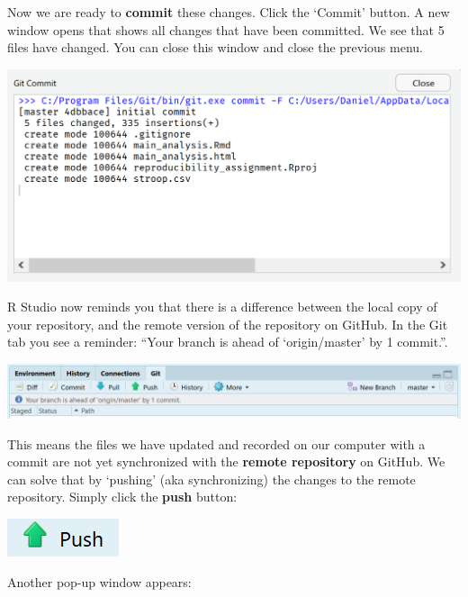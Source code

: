 \documentclass[
  oneside]{krantz}
\begin{document}
Now we are ready to \textbf{commit} these changes. Click the `Commit' button. A new
window opens that shows all changes that have been committed. We see that 5
files have changed. You can close this window and close the previous menu.

\begin{center}\includegraphics[width=1\linewidth]{images/bd217abdabf5cc4e81637d8d0eb7db9e} \end{center}

R Studio now reminds you that there is a difference between the local copy of
your repository, and the remote version of the repository on GitHub. In the Git
tab you see a reminder: ``Your branch is ahead of `origin/master' by 1 commit.''.

\begin{center}\includegraphics[width=1\linewidth]{images/b3c606d72795bf88e1b7a04dbce381bb} \end{center}

This means the files we have updated and recorded on our computer with a commit
are not yet synchronized with the \textbf{remote repository} on GitHub. We can solve
that by `pushing' (aka synchronizing) the changes to the remote repository.
Simply click the \textbf{push} button:

\begin{center}\includegraphics[width=0.2\linewidth]{images/7a363782af473d6da3e79f3a088d527b} \end{center}

Another pop-up window appears:
\end{document}
